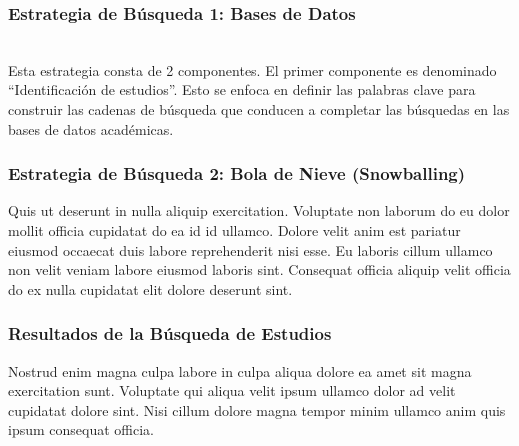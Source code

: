 \subsubsection{Estrategia de Búsqueda 1: Bases de Datos}
\mbox{}\\
Esta estrategia consta de 2 componentes. El primer componente es denominado ``Identificación de estudios''. Esto se enfoca en definir las palabras clave para construir las cadenas de búsqueda que conducen a completar las búsquedas en las bases de datos académicas.
\mbox{}\\

\subsubsection{Estrategia de Búsqueda 2: Bola de Nieve (Snowballing)}
Quis ut deserunt in nulla aliquip exercitation. Voluptate non laborum do eu dolor mollit officia cupidatat do ea id id ullamco. Dolore velit anim est pariatur eiusmod occaecat duis labore reprehenderit nisi esse. Eu laboris cillum ullamco non velit veniam labore eiusmod laboris sint. Consequat officia aliquip velit officia do ex nulla cupidatat elit dolore deserunt sint.
\mbox{}\\

\subsubsection{Resultados de la Búsqueda de Estudios}
\label{subsubsec:resultados-busqueda}
Nostrud enim magna culpa labore in culpa aliqua dolore ea amet sit magna exercitation sunt. Voluptate qui aliqua velit ipsum ullamco dolor ad velit cupidatat dolore sint. Nisi cillum dolore magna tempor minim ullamco anim quis ipsum consequat officia.
\mbox{}\\